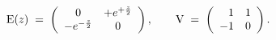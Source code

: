 \begin{equation}
{\rm E}(z)\;=\;\left(\begin{array}{cc} 0 & +e^{+\frac{z}{2}}\\
-e^{-\frac{z}{2}} & 0 \end{array}\right),\qquad
{\rm V}\;=\;\left(\begin{array}{rr} 1 & 1 \\ -1 & 0 \end{array}\right).
\end{equation}

